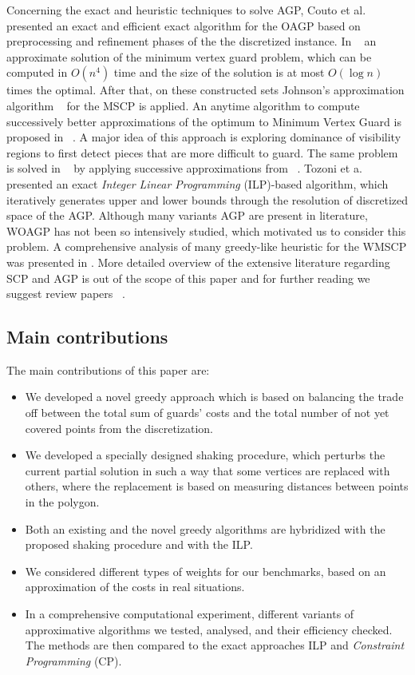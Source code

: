 \documentclass[runningheads,a4paper]{elsarticle}
\begin{document}
	Concerning the exact and heuristic techniques to solve AGP, Couto et al.~\cite{couto2007exact} presented an exact and efficient exact algorithm for the OAGP based on preprocessing and refinement phases of the the discretized instance. In ~\cite{ghosh2010approximation} an approximate solution of the minimum vertex guard problem, which can be computed in $O(n^4)$ time and the size of the solution is at most $O(\log n)$ times the optimal. After that, on these constructed sets Johnson’s approximation algorithm ~\cite{johnson1974approximation} for the MSCP is applied. An anytime algorithm to compute successively better approximations of the optimum to Minimum Vertex Guard is proposed in ~\cite{tomas2003approximation}.  A major idea of this approach is exploring dominance of visibility regions to first detect pieces that are
	more difficult to guard. The same problem is solved   in ~\cite{tomas2006visibility} by applying successive approximations from  ~\cite{tomas2003approximation}.
	Tozoni et a. ~\cite{tozoni2013practical,tozoni2016algorithm}  presented an exact \emph{Integer Linear Programming}  (ILP)-based  algorithm, which iteratively generates upper and lower bounds through the resolution of discretized space of the AGP. Although many variants AGP are present in literature, WOAGP has not been so intensively studied, which motivated us to consider this problem.
	A comprehensive analysis of many greedy-like heuristic for the WMSCP was presented in \cite{vasko2016best}.
	More detailed overview of the extensive literature regarding SCP and AGP is out of the scope of this paper and for further reading we suggest review papers ~\cite{caprara2000algorithms,ren2010new,ghosh2010approximation2}.
	
	\subsection{Main contributions}
	The main contributions of this paper are:
	\begin{itemize}
		\item We developed a novel greedy approach which is based on balancing the trade off between the total sum of guards' costs and the total number of not yet covered points from the discretization.
		\item We developed a specially designed shaking procedure, which perturbs the current partial solution in such a way that some vertices are replaced with others, where the replacement is based on measuring  distances between points in the polygon.
		\item Both an existing and the novel greedy algorithms are hybridized with the proposed shaking procedure and with the ILP.
		\item We considered different types of weights for our benchmarks, based on an approximation of the costs in real situations.
		\item In a comprehensive computational experiment,  different variants of approximative algorithms we tested, analysed, and their efficiency checked. The methods are then compared to the exact approaches ILP and \emph{Constraint Programming} (CP).
	\end{itemize}
\end{document}
